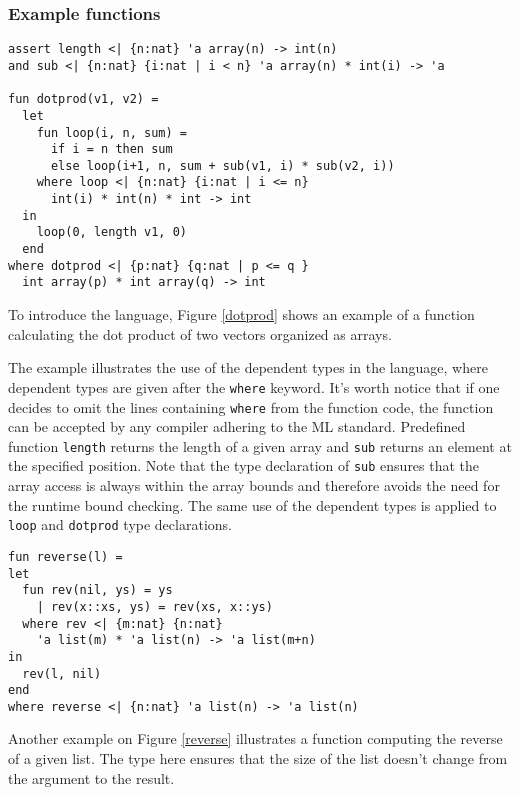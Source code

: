 \documentclass[a4paper,UKenglish]{lipics-v2016}
\begin{document}
\subsubsection{Example functions}

\begin{lstlisting}[caption={The dot product function},label=dotprod,captionpos=t,float,abovecaptionskip=-\medskipamount]
assert length <| {n:nat} 'a array(n) -> int(n)
and sub <| {n:nat} {i:nat | i < n} 'a array(n) * int(i) -> 'a

fun dotprod(v1, v2) =
  let
    fun loop(i, n, sum) =
      if i = n then sum
      else loop(i+1, n, sum + sub(v1, i) * sub(v2, i))
    where loop <| {n:nat} {i:nat | i <= n}
      int(i) * int(n) * int -> int
  in
    loop(0, length v1, 0)
  end
where dotprod <| {p:nat} {q:nat | p <= q }
  int array(p) * int array(q) -> int
\end{lstlisting}

To introduce the language, Figure \ref{dotprod} shows an example of a function
calculating the dot product of two vectors organized as arrays.

The example illustrates the use of the dependent types in the language, where
dependent types are given after the \texttt{where} keyword. It's worth notice
that if one decides to omit the lines containing \texttt{where} from the
function code, the function can be accepted by any compiler adhering to the ML
standard. Predefined function \texttt{length} returns the length of a given
array and \texttt{sub} returns an element at the specified position. Note that
the type declaration of \texttt{sub} ensures that the array access is always
within the array bounds and therefore avoids the need for the runtime bound
checking. The same use of the dependent types is applied to \texttt{loop} and
\texttt{dotprod} type declarations.

\begin{lstlisting}[caption={The reverse function for lists},label=reverse,captionpos=t,float,abovecaptionskip=-\medskipamount]
fun reverse(l) =
let
  fun rev(nil, ys) = ys
    | rev(x::xs, ys) = rev(xs, x::ys)
  where rev <| {m:nat} {n:nat}
    'a list(m) * 'a list(n) -> 'a list(m+n)
in
  rev(l, nil)
end
where reverse <| {n:nat} 'a list(n) -> 'a list(n)
\end{lstlisting}

Another example on Figure \ref{reverse} illustrates a function computing the
reverse of a given list. The type here ensures that the size of the list
doesn't change from the argument to the result.
\end{document}
